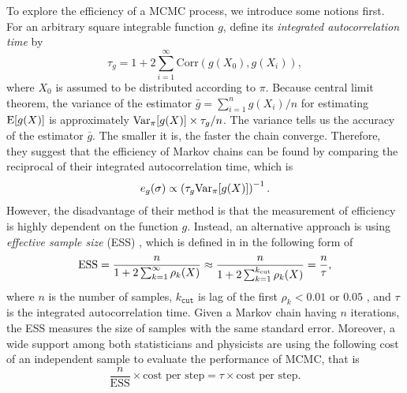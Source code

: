 To explore the efficiency of a MCMC process, we introduce some notions first. For an arbitrary square integrable function $g$, \cite{roberts2001optimal} define its \textit{integrated autocorrelation time} by 
\begin{equation*}
\tau_g = 1+ 2\sum_{i=1}^{\infty} \mathrm{Corr}\left( g(X_0),g(X_i) \right),
\end{equation*}
where $X_0$ is assumed to be distributed according to $\pi$. Because central limit theorem, the variance of the estimator $\bar{g} = \sum_{i=1}^{n}g(X_i)/n$ for estimating $\mathrm{E}\lbrack g(X) \rbrack$ is approximately $\mathrm{Var}_\pi\lbrack g(X)\rbrack \times \tau_g/n$. The variance tells us the accuracy of the estimator $\bar{g}$. The smaller it is, the faster the chain converge. Therefore, they suggest that the efficiency of Markov chains can be found by comparing the reciprocal of their integrated autocorrelation time, which is 
\begin{equation*}
e_g(\sigma)\propto \left(\tau_g\mathrm{Var}_\pi\lbrack g(X)\rbrack \right)^{-1}. 
\end{equation*}
However, the disadvantage of their method is that the measurement of efficiency is highly dependent on the function $g$. Instead, an alternative approach is using \textit{effective sample size} (ESS) \citep{kass1998markov, robert2004monte},  which is defined in \citep{gong2016practical} in the following form of  
\begin{equation*}
\mbox{ESS} =  \frac{n}{1+2\sum_{k=1}^{\infty}\rho_k(X)} \approx \frac{n}{1+2\sum_{k=1}^{k_\text{\tiny cut}}\rho_k(X)}= \frac{n}{\tau}, 
\end{equation*}
where $n$ is the number of samples, $k_\mathtt{cut}$ is lag of the first $\rho_k<0.01$  or $0.05$ , and $\tau$ is the integrated autocorrelation time. Given a Markov chain having $n$ iterations, the ESS measures the size of \iid samples with the same standard error. Moreover, a wide support among both statisticians \citep{geyer1992practical} and physicists \citep{sokal1997monte} are using the following cost of an independent sample to evaluate the performance of MCMC, that is 
\begin{equation*}
\frac{n}{\mbox{ESS}}\times \mbox{cost per step} = \tau \times  \mbox{cost per step}.
\end{equation*} 

